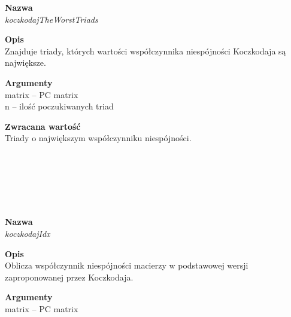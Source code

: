\begin{spacing}{1.1}
\begin{spacing}{1.2}
\begin{spacing}{1.2}
\begin{spacing}{1.2}
\textbf{Nazwa}\\  \emph{koczkodajTheWorstTriads} \\ \begin{spacing}{0.3}  \end{spacing}
 
\textbf{Opis}\\ Znajduje triady, których wartości współczynnika niespójności Koczkodaja są największe.\\  \begin{spacing}{0.3}  \end{spacing}
 
\textbf{Argumenty} \\
matrix -- PC matrix \\ 
n -- ilość poczukiwanych triad	\\ \begin{spacing}{0.3}  \end{spacing}

\textbf{Zwracana wartość}\\ Triady o największym współczynniku niespójności. \\ \begin{spacing}{0.3}  \end{spacing}\\

\\~\\
\begin{spacing}{1.2}
 \\ \begin{spacing}{0.5}  \end{spacing}

\textbf{Nazwa}\\ \emph{koczkodajIdx} \\ \begin{spacing}{0.3}  \end{spacing}
 
\textbf{Opis}\\ Oblicza współczynnik niespójności macierzy w podstawowej wersji zaproponowanej przez Koczkodaja.\\  \begin{spacing}{0.3}  \end{spacing}
 
\textbf{Argumenty} \\
matrix -- PC matrix \\ \begin{spacing}{0.3}  \end{spacing}


\end{spacing}
\end{spacing}
\end{spacing}
\end{spacing}
\end{spacing}
